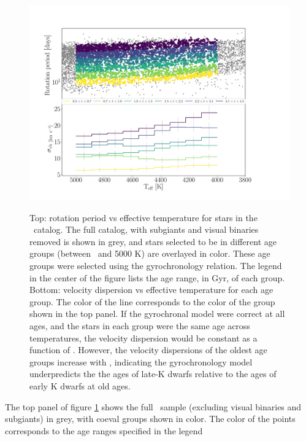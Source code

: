 \begin{figure}
  \caption{
Top: rotation period vs effective temperature for stars in the \mct\
    catalog.
    The full catalog, with subgiants and visual binaries removed is shown in
    grey, and stars selected to be in different age groups (between \tmin\ and
    5000 K) are overlayed in color.
These age groups were selected using the \citet{angus2019} gyrochronology
    relation.
The legend in the center of the figure lists the age range, in Gyr, of each
    group.
Bottom: velocity dispersion vs effective temperature for each age
    group.
The color of the line corresponds to the color of the group shown in the top
    panel.
If the gyrochronal model were correct at all ages, and the stars in each group
    were the same age across temperatures, the velocity dispersion would be
    constant as a function of \teff.
However, the velocity dispersions of the oldest age groups increase with
    \teff, indicating the \citet{angus2019} gyrochronology model underpredicts
    the the ages of late-K dwarfs relative to the ages of early K dwarfs at
    old ages.
}
  \centering
    \includegraphics[width=1\textwidth]{age_cut}
\label{fig:age_cut}
\end{figure}
The top panel of figure \ref{fig:age_cut} shows the full \mct\ sample
(excluding visual binaries and subgiants) in grey, with coeval groups shown in
color.
The color of the points corresponds to the age ranges specified in the legend
